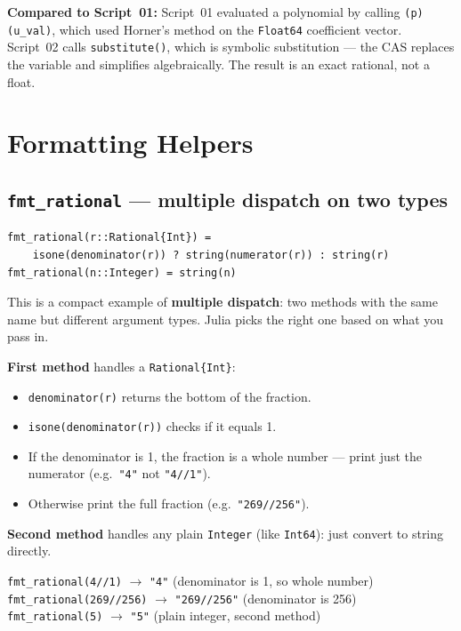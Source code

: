\documentclass[12pt, a4paper]{article}
\newcommand{\cd}[1]{\texttt{#1}}
\begin{document}
\begin{diffbox}
\textbf{Compared to Script~01:}
Script~01 evaluated a polynomial by calling \cd{(p)(u\_val)},
which used Horner's method on the \cd{Float64} coefficient vector.
Script~02 calls \cd{substitute()}, which is symbolic substitution
--- the CAS replaces the variable and simplifies algebraically.
The result is an exact rational, not a float.
\end{diffbox}


\section{Formatting Helpers}

\subsection{\texttt{fmt\_rational} --- multiple dispatch on two types}

\begin{verbatim}
fmt_rational(r::Rational{Int}) =
    isone(denominator(r)) ? string(numerator(r)) : string(r)
fmt_rational(n::Integer) = string(n)
\end{verbatim}

This is a compact example of \textbf{multiple dispatch}:
two methods with the same name but different argument types.
Julia picks the right one based on what you pass in.

\textbf{First method} handles a \cd{Rational\{Int\}}:
\begin{itemize}
  \item \cd{denominator(r)} returns the bottom of the fraction.
  \item \cd{isone(denominator(r))} checks if it equals 1.
  \item If the denominator is 1, the fraction is a whole number ---
        print just the numerator (e.g.\ \cd{"4"} not \cd{"4//1"}).
  \item Otherwise print the full fraction (e.g.\ \cd{"269//256"}).
\end{itemize}

\textbf{Second method} handles any plain \cd{Integer}
(like \cd{Int64}): just convert to string directly.

\begin{examplebox}
\cd{fmt\_rational(4//1)}    $\to$ \cd{"4"} \quad (denominator is 1, so whole number) \\
\cd{fmt\_rational(269//256)} $\to$ \cd{"269//256"} \quad (denominator is 256) \\
\cd{fmt\_rational(5)}       $\to$ \cd{"5"} \quad (plain integer, second method)
\end{examplebox}
\end{document}
